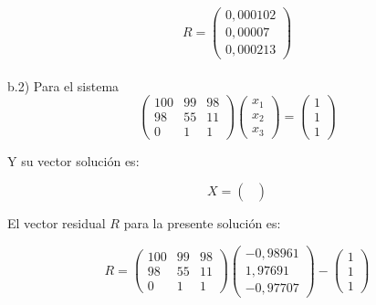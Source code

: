 \begin{equation*}
    R=
    \begin{pmatrix}
        0,000102 \\
        0,00007 \\
        0,000213
    \end{pmatrix}
\end{equation*}
\\
b.2) Para el sistema
\begin{equation*}
    \begin{pmatrix}
        100 & 99 & 98 \\
        98 & 55 & 11 \\
        0 & 1 & 1
    \end{pmatrix}
    \begin{pmatrix}
        x_1 \\
        x_2 \\
        x_3
    \end{pmatrix}    
    =    
    \begin{pmatrix}
        1 \\
        1 \\
        1
    \end{pmatrix}
\end{equation*}

Y su vector solución es:

\begin{equation*}
    X=
    \begin{pmatrix}
         \\
         \\
        
    \end{pmatrix}    
\end{equation*}

El vector residual $R$ para la presente solución es:

\begin{equation*}
    R=
    \begin{pmatrix}
        100 & 99 & 98 \\
        98 & 55 & 11 \\
        0 & 1 & 1
    \end{pmatrix}
    \begin{pmatrix}
        -0,98961 \\
        1,97691 \\
        -0,97707
    \end{pmatrix}    
    -   
    \begin{pmatrix}
        1 \\
        1 \\
        1
    \end{pmatrix}
\end{equation*}

